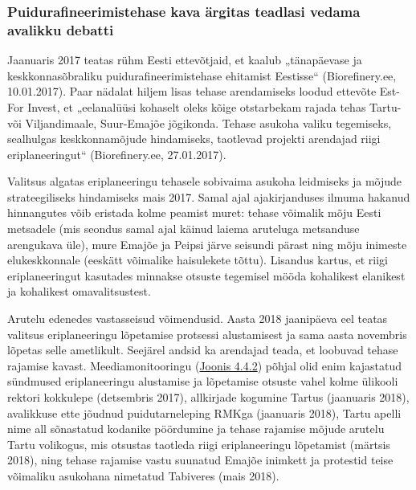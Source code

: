 \documentclass[estonian,]{article}
\begin{document}
\hypertarget{puidurafineerimistehase-kava-uxe4rgitas-teadlasi-vedama-avalikku-debatti}{%
\subsubsection*{Puidurafineerimistehase kava ärgitas teadlasi vedama avalikku debatti}\label{puidurafineerimistehase-kava-uxe4rgitas-teadlasi-vedama-avalikku-debatti}}

Jaanuaris 2017 teatas rühm Eesti ettevõtjaid, et kaalub „tänapäevase ja keskkonnasõbraliku puidurafineerimistehase ehitamist Eestisse`` (Biorefinery.ee, 10.01.2017). Paar nädalat hiljem lisas tehase arendamiseks loodud ettevõte Est-For Invest, et „eelanalüüsi kohaselt oleks kõige otstarbekam rajada tehas Tartu- või Viljandimaale, Suur-Emajõe jõgikonda. Tehase asukoha valiku tegemiseks, sealhulgas keskkonnamõjude hindamiseks, taotlevad projekti arendajad riigi eriplaneeringut`` (Biorefinery.ee, 27.01.2017).

Valitsus algatas eriplaneeringu tehasele sobivaima asukoha leidmiseks ja mõjude strateegiliseks hindamiseks mais 2017. Samal ajal ajakirjanduses ilmuma hakanud hinnangutes võib eristada kolme peamist muret: tehase võimalik mõju Eesti metsadele (mis seondus samal ajal käinud laiema aruteluga metsanduse arengukava üle), mure Emajõe ja Peipsi järve seisundi pärast ning mõju inimeste elukeskkonnale (eeskätt võimalike haisulekete tõttu). Lisandus kartus, et riigi eriplaneeringut kasutades minnakse otsuste tegemisel mööda kohalikest elanikest ja kohalikest omavalitsustest.

Arutelu edenedes vastasseisud võimendusid. Aasta 2018 jaanipäeva eel teatas valitsus eriplaneeringu lõpetamise protsessi alustamisest ja sama aasta novembris lõpetas selle ametlikult. Seejärel andsid ka arendajad teada, et loobuvad tehase rajamise kavast. Meediamonitooringu (\protect\hyperlink{figure442}{Joonis 4.4.2}) põhjal olid enim kajastatud sündmused eriplaneeringu alustamise ja lõpetamise otsuste vahel kolme ülikooli rektori kokkulepe (detsembris 2017), allkirjade kogumine Tartus (jaanuaris 2018), avalikkuse ette jõudnud puidutarneleping RMKga (jaanuaris 2018), Tartu apelli nime all sõnastatud kodanike pöördumine ja tehase rajamise mõjude arutelu Tartu volikogus, mis otsustas taotleda riigi eriplaneeringu lõpetamist (märtsis 2018), ning tehase rajamise vastu suunatud Emajõe inimkett ja protestid teise võimaliku asukohana nimetatud Tabiveres (mais 2018).
\end{document}
